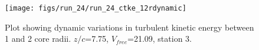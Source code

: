 \begin{figure}[H]
\centering
\texttt{[image: figs/run\_24/run\_24\_ctke\_12rdynamic]}
\caption{Plot showing dynamic variations in turbulent kinetic energy between 1 and 2 core radii. $z/c$=7.75, $V_{free}$=21.09, station 3.}
\label{fig:run_24_ctke_12rdynamic}
\end{figure}


